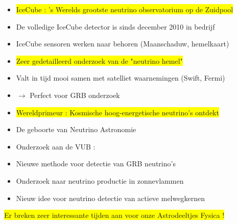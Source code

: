 \onecolumn
\begin{itemize}
\item \colorbox{yellow}{IceCube : 's Werelds grootste neutrino observatorium op de Zuidpool}
\item[] De volledige IceCube detector is sinds december 2010 in bedrijf
\item[] IceCube sensoren werken naar behoren (Maanschaduw, hemelkaart)
\item \colorbox{yellow}{Zeer gedetailleerd onderzoek van de "neutrino hemel"}
\item[] Valt in tijd mooi samen met satelliet waarnemingen (Swift, Fermi)
\item[] $\rightarrow$ Perfect voor GRB onderzoek
\item \colorbox{yellow}{Wereldprimeur : Kosmische hoog-energetische neutrino's ontdekt}
\item[] \begin{center}{\blue De geboorte van Neutrino Astronomie}\end{center}
\item {\red Onderzoek aan de VUB :}
\item[] Nieuwe methode voor detectie van GRB neutrino's
\item[] Onderzoek naar neutrino productie in zonnevlammen
\item[] Nieuw idee voor neutrino detectie van actieve melwegkernen 
\end{itemize}
%
\begin{center}
\colorbox{yellow}{Er breken zeer interessante tijden aan voor onze Astrodeeltjes Fysica !}
\end{center}
